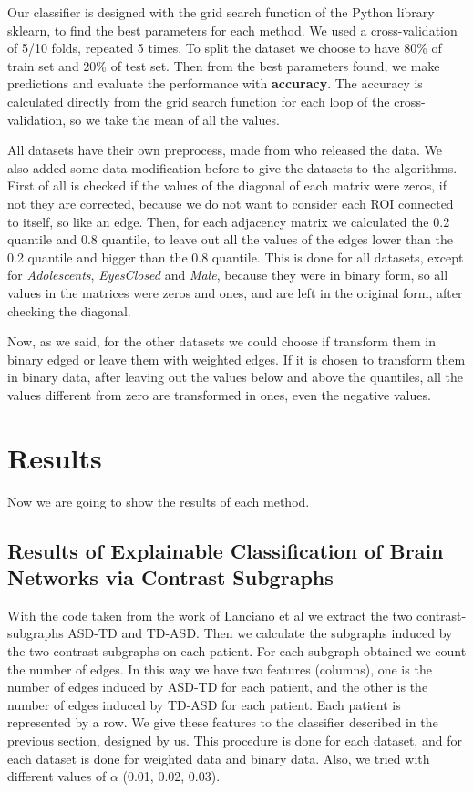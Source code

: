 Our classifier is designed with the grid search function of the Python library sklearn, to find the best parameters for each method. We used a cross-validation of 5/10 folds, repeated 5 times. To split the dataset we choose to have 80\% of train set and 20\% of test set. Then from the best parameters found, we make predictions and evaluate the performance with \textbf{accuracy}. The accuracy is calculated directly from the grid search function for each loop of the cross-validation, so we take the mean of all the values. 
\vspace{0.5cm}

All datasets have their own preprocess, made from who released the data. We also added some data modification before to give the datasets to the algorithms. First of all is checked if the values of the diagonal of each matrix were zeros, if not they are corrected, because we do not want to consider each ROI connected to itself, so like an edge. Then, for each adjacency matrix we calculated the 0.2 quantile and 0.8 quantile, to leave out all the values of the edges lower than the 0.2 quantile and bigger than the 0.8 quantile. This is done for all datasets, except for \textit{Adolescents}, \textit{EyesClosed} and \textit{Male}, because they were in binary form, so all values in the matrices were zeros and ones, and are left in the original form, after checking the diagonal. 
\vspace{0.5cm}

Now, as we said, for the other datasets we could choose if transform them in binary edged or leave them with weighted edges. If it is chosen to transform them in binary data, after leaving out the values below and above the quantiles, all the values different from zero are transformed in ones, even the negative values.


\section{Results}
Now we are going to show the results of each method.
\vspace{0.5cm}

\subsection{Results of Explainable Classification of Brain Networks via Contrast Subgraphs}

With the code taken from the work of Lanciano et al \cite{lanciano2020cs} we extract the two contrast-subgraphs ASD-TD and TD-ASD. Then we calculate the subgraphs induced by the two contrast-subgraphs on each patient. For each subgraph obtained we count the number of edges. In this way we have two features (columns), one is the number of edges induced by ASD-TD for each patient, and the other is the number of edges induced by TD-ASD for each patient. Each patient is represented by a row. We give these features to the classifier described in the previous section, designed by us. This procedure is done for each dataset, and for each dataset is done for weighted data and binary data. Also, we tried with different values of $\alpha$ (0.01, 0.02, 0.03).
\vspace{0.5cm}

